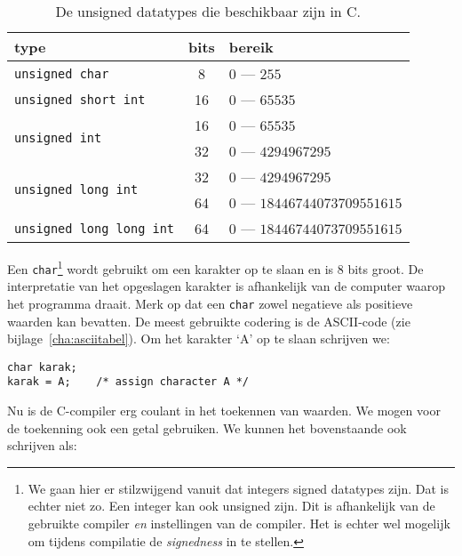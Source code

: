 \begin{table}[!ht]
\centering
\caption{De unsigned datatypes die beschikbaar zijn in C.}
\label{tab:varintdatatypesunsiged}
\begin{tabular}{@{}lcl@{}}
\toprule
\textbf{type}                               & \textbf{bits} & \textbf{bereik}  \\ \midrule
\texttt{unsigned char}                      & 8             & $0$ --- $255$  \\
\texttt{unsigned short int}                 & 16            & $0$ --- $65535$ \\
\multirow{2}{*}{\texttt{unsigned int}}      & 16            & $0$ --- $65535$ \\
                                            & 32            & $0$ --- $4294967295$ \\
\multirow{2}{*}{\texttt{unsigned long int}} & 32            & $0$ --- $4294967295$ \\
                                            & 64            & $0$ --- $18446744073709551615$  \\
\texttt{unsigned long long int}             & 64            & $0$ --- $18446744073709551615$  \\
   \bottomrule
\end{tabular}
\end{table}

Een \texttt{char}\footnote{We gaan hier er stilzwijgend vanuit dat integers signed datatypes zijn. Dat is echter niet zo. Een integer kan ook unsigned zijn. Dit is afhankelijk van de gebruikte compiler \textsl{en} instellingen van de compiler. Het is echter wel mogelijk om tijdens compilatie de \textsl{signedness} in te stellen.} wordt gebruikt om een karakter op te slaan en is 8 bits groot. De interpretatie van het opgeslagen karakter is afhankelijk van de computer waarop het programma draait. Merk op dat een \texttt{char} zowel negatieve als positieve waarden kan bevatten. De meest gebruikte codering is de ASCII-code (zie bijlage~\ref{cha:asciitabel}). Om het karakter `A' op te slaan schrijven we:

\hspace*{1em}\texttt{char karak;}\\
\hspace*{1em}\texttt{karak = \textquotesingle A\textquotesingle; \ \ \ /* assign character A */}

Nu is de C-compiler erg coulant in het toekennen van waarden. We mogen voor de toekenning ook een getal gebruiken. We kunnen het bovenstaande ook schrijven als:

